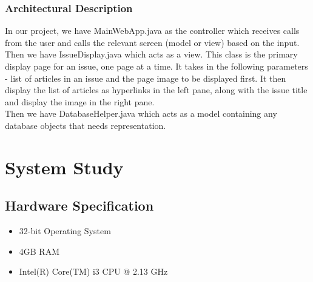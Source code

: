 \documentclass[amsart, 12pt]{article}
\begin{document}
\subsubsection{Architectural Description}
In our project, we have MainWebApp.java as the controller which receives calls from the user and calls the relevant screen (model or view) based on the input.\\
Then we have IssueDisplay.java which acts as a view. This class is the primary display page for an issue, one page at a time.  It takes in the following parameters - list of articles in an issue and the page image to be displayed first.
It then display the list of articles as hyperlinks in the left pane, along with the issue title and display the image in the right pane. \\
Then we have DatabaseHelper.java which acts as a model containing any database objects that needs representation.


\section{System Study}
\subsection{Hardware Specification}
\begin{itemize}
    \item 32-bit Operating System 
\item 4GB RAM 
\item Intel(R) Core(TM) i3 CPU @ 2.13 GHz
\end{itemize}
\end{document}
